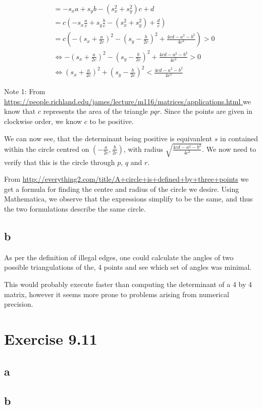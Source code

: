 \documentclass[11pt,a4paper]{article}
\begin{document}
\begin{align}
    &= - s_x a + s_y b - (s_x^2+s_y^2) c + d \\
    &= c (- s_x \frac{a}{c} + s_y \frac{b}{c} - (s_x^2+s_y^2) + \frac{d}{c})\\
    &= c (- (s_x + \frac{a}{2c})^2 - (s_y - \frac{b}{2c})^2 + \frac{4cd-a^2-b^2}{4c^2}) > 0 \\
    &\Leftrightarrow - (s_x + \frac{a}{2c})^2 - (s_y - \frac{b}{2c})^2 + \frac{4cd-a^2-b^2}{4c^2} > 0 \tag{Since c > 0, see note 1.} \\ 
    &\Leftrightarrow (s_x + \frac{a}{2c})^2 + (s_y - \frac{b}{2c})^2 < \frac{4cd-a^2-b^2}{4c^2}
\end{align}

Note 1: From
\url{https://people.richland.edu/james/lecture/m116/matrices/applications.html
} we know that $c$ represents the area of the triangle $pqr$. Since the points
are given in clockwise order, we know $c$ to be positive.

We can now see, that the determinant being positive is equivanlent $s$ in
contained within the circle centred on $(-\frac{a}{2c}, \frac{b}{2c})$, with
radius $\sqrt{\frac{4cd-a^2-b^2}{4c^2}}$. We now need to verify that this is
the circle through $p$, $q$ and $r$.

From \url{http://everything2.com/title/A+circle+is+defined+by+three+points} we
get a formula for finding the centre and radius of the circle we desire. Using
Mathematica, we observe that the expressions simplify to be the same, and thus
the two formulations describe the same circle.

\subsection{b}
As per the definition of illegal edges, one could calculate the angles of
two possible triangulations of the, 4 points and see which set of angles was
minimal.

This would probably execute faster than computing the determinant of a 4 by
4 matrix, however it seems more prone to problems arising from numerical
precision.

\section{Exercise 9.11}
\subsection{a}


\subsection{b}
\end{document}
